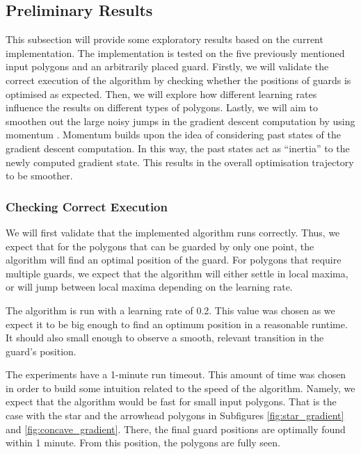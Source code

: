 \subsection{Preliminary Results}
This subsection will provide some exploratory results based on the current implementation. The implementation is tested on the five previously mentioned input polygons and an arbitrarily placed guard. Firstly, we will validate the correct execution of the algorithm by checking whether the positions of guards is optimised as expected. Then, we will explore how different learning rates influence the results on different types of polygons. Lastly, we will aim to smoothen out the large noisy jumps in the gradient descent computation by using momentum \cite{goodfelow2016deep}. Momentum builds upon the idea of considering past states of the gradient descent computation. In this way, the past states act as ``inertia'' to the newly computed gradient state. This results in the overall optimisation trajectory to be smoother. 

\subsubsection{Checking Correct Execution}
We will first validate that the implemented algorithm runs correctly. Thus, we expect that for the polygons that can be guarded by only one point, the algorithm will find an optimal position of the guard. For polygons that require multiple guards, we expect that the algorithm will either settle in local maxima, or will jump between local maxima depending on the learning rate.

The algorithm is run with a learning rate of 0.2. This value was chosen as we expect it to be big enough to find an optimum position in a reasonable runtime. It should also small enough to observe a smooth, relevant transition in the guard's position.

The experiments have a 1-minute run timeout. This amount of time was chosen in order to build some intuition related to the speed of the algorithm. Namely, we expect that the algorithm would be fast for small input polygons. That is the case with the star and the arrowhead polygons in Subfigures \ref{fig:star_gradient} and \ref{fig:concave_gradient}. There, the final guard positions are optimally found within 1 minute. From this position, the polygons are fully seen.


